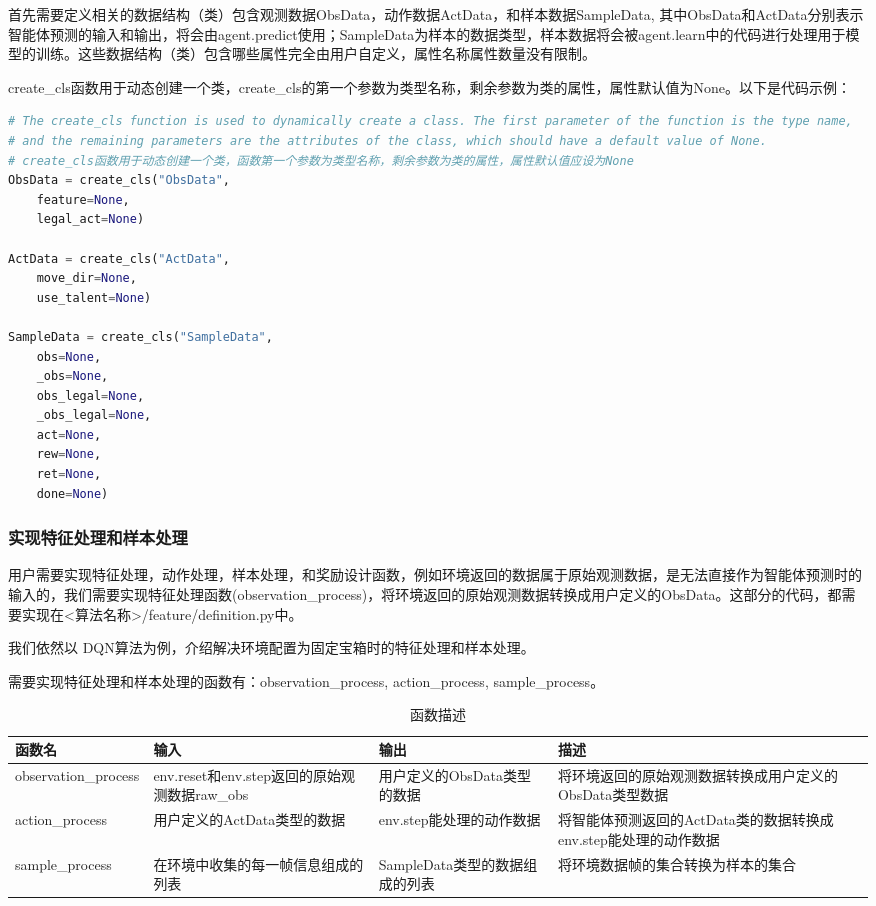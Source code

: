 首先需要定义相关的数据结构（类）包含观测数据ObsData，动作数据ActData，和样本数据SampleData, 其中ObsData和ActData分别表示智能体预测的输入和输出，将会由agent.predict使用；SampleData为样本的数据类型，样本数据将会被agent.learn中的代码进行处理用于模型的训练。这些数据结构（类）包含哪些属性完全由用户自定义，属性名称属性数量没有限制。

create\_cls函数用于动态创建一个类，create\_cls的第一个参数为类型名称，剩余参数为类的属性，属性默认值为None。以下是代码示例：

\begin{lstlisting}[language=Python]
# The create_cls function is used to dynamically create a class. The first parameter of the function is the type name,
# and the remaining parameters are the attributes of the class, which should have a default value of None.
# create_cls函数用于动态创建一个类，函数第一个参数为类型名称，剩余参数为类的属性，属性默认值应设为None
ObsData = create_cls("ObsData",
    feature=None,
    legal_act=None)

ActData = create_cls("ActData",
    move_dir=None,
    use_talent=None)

SampleData = create_cls("SampleData",
    obs=None,
    _obs=None,
    obs_legal=None,
    _obs_legal=None,
    act=None,
    rew=None,
    ret=None,
    done=None) 
\end{lstlisting}

\subsubsection{实现特征处理和样本处理}

用户需要实现特征处理，动作处理，样本处理，和奖励设计函数，例如环境返回的数据属于原始观测数据，是无法直接作为智能体预测时的输入的，我们需要实现特征处理函数(observation\_process)，将环境返回的原始观测数据转换成用户定义的ObsData。这部分的代码，都需要实现在<算法名称>/feature/definition.py中。

我们依然以 DQN算法为例，介绍解决环境配置为固定宝箱时的特征处理和样本处理。

需要实现特征处理和样本处理的函数有：observation\_process, action\_process, sample\_process。


\begin{table}[H]
    \begin{tabularx}{1\textwidth}{ X X X X } %
        \hline %
        \textbf{函数名} & \textbf{输入} & \textbf{输出} & \textbf{描述} \\
        \hline
        observation\_process&env.reset和env.step返回的原始观测数据raw\_obs&用户定义的ObsData类型的数据&将环境返回的原始观测数据转换成用户定义的ObsData类型数据\\
        action\_process&用户定义的ActData类型的数据&env.step能处理的动作数据&将智能体预测返回的ActData类的数据转换成env.step能处理的动作数据\\
        sample\_process&在环境中收集的每一帧信息组成的列表&SampleData类型的数据组成的列表&将环境数据帧的集合转换为样本的集合\\
        \hline
    \end{tabularx}

    \centering
    \caption{函数描述}
    \label{functions}
\end{table}

